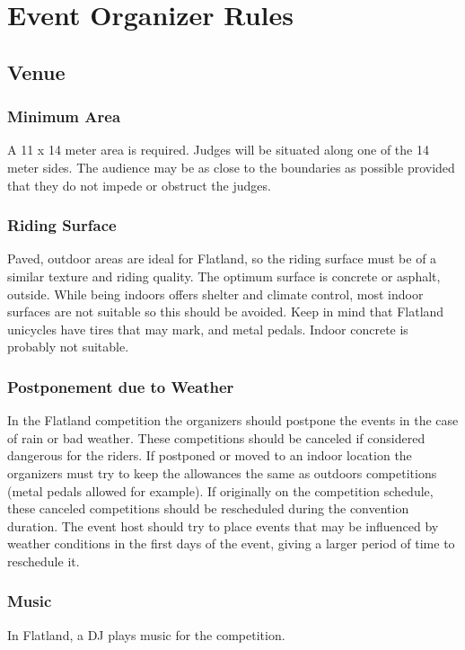 \chapter{Event Organizer Rules}

\section{Venue}

\subsection{Minimum Area \label{sec:flat-street_flatland-performing-area}}
A 11 x 14 meter area is required.
Judges will be situated along one of the 14 meter sides.
The audience may be as close to the boundaries as possible provided that they do not impede or obstruct the judges.

\subsection{Riding Surface}
Paved, outdoor areas are ideal for Flatland, so the riding surface must be of a similar texture and riding quality.
The optimum surface is concrete or asphalt, outside.
While being indoors offers shelter and climate control, most indoor surfaces are not suitable so this should be avoided.
Keep in mind that Flatland unicycles have tires that may mark, and metal pedals. Indoor concrete is probably not suitable.

\subsection{Postponement due to Weather}

In the Flatland competition the organizers should postpone the events in the case of rain or bad weather.
These competitions should be canceled if considered dangerous for the riders.
If postponed or moved to an indoor location the organizers must try to keep the allowances the same as outdoors competitions (metal pedals allowed for example).
If originally on the competition schedule, these canceled competitions should be rescheduled during the convention duration.
The event host should try to place events that may be influenced by weather conditions in the first days of the event, giving a larger period of time to reschedule it.

\subsection{Music}
In Flatland, a DJ plays music for the competition.

